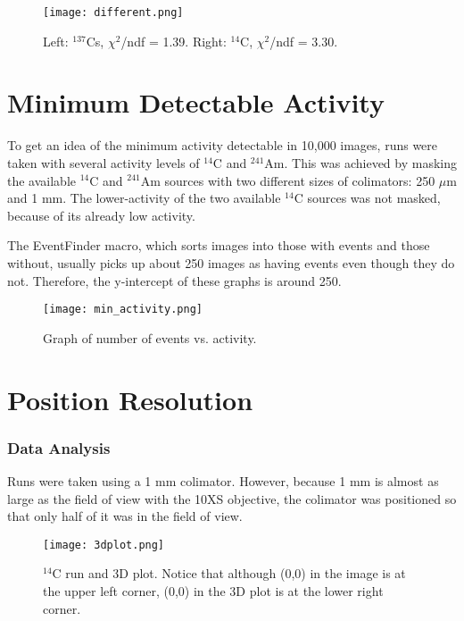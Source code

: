 \documentclass[a4paper,10pt]{article}
\begin{document}
\begin{figure}[!htbp]
	\centering
	\texttt{[image: different.png]}
	\caption{Left: $^{137}$Cs, $\chi ^2$/ndf = 1.39. Right: $^{14}$C, $\chi ^2$/ndf = 3.30.}
	\label{fig:different}
\end{figure}


\part{Minimum Detectable Activity}

To get an idea of the minimum activity detectable in 10,000 images, runs were taken with several activity levels of $^{14}$C and $^{241}$Am. This was achieved by masking the available $^{14}$C and $^{241}$Am sources with two different sizes of colimators: 250 $\mu$m and 1 mm. The lower-activity of the two available $^{14}$C sources was not masked, because of its already low activity. 

The EventFinder macro, which sorts images into those with events and those without, usually picks up about 250 images as having events even though they do not. Therefore, the y-intercept of these graphs is around 250. 

\begin{figure}[!htbp]
	\centering
	\texttt{[image: min\_activity.png]}
	\caption{Graph of number of events vs. activity.}
	\label{fig:mindetect}
\end{figure}


\part{Position Resolution}

\section{Data Analysis}

Runs were taken using a 1 mm colimator. However, because 1 mm is almost as large as the field of view with the 10XS objective, the colimator was positioned so that only half of it was in the field of view.

\begin{figure}[!htbp]
	\centering
	\texttt{[image: 3dplot.png]}
	\caption{$^{14}$C run and 3D plot. Notice that although (0,0) in the image is at the upper left corner, (0,0) in the 3D plot is at the lower right corner.}
	\label{fig:3dplot}
\end{figure}
\end{document}
